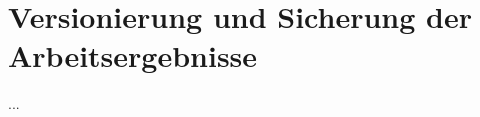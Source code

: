\chapter{Versionierung und Sicherung der Arbeitsergebnisse}\label{ch:versionierung-und-sicherung-der-arbeitsergebnisse}
...
